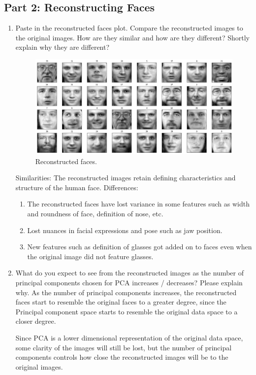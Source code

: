 \subsection{Part 2: Reconstructing Faces}
\begin{enumerate}
    \item Paste in the reconstructed faces plot. Compare the reconstructed images to the original images. How are they similar and how are they different? Shortly explain why they are different?
    \begin{figure}[H]
    	\centering
    	\includegraphics[width=1\textwidth]{templates/reconstructed_faces}
    	\caption{Reconstructed faces.}
    	\label{fig:my_label}
    \end{figure}
Similarities: The reconstructed images retain defining characteristics and structure of the human face.
Differences:
\begin{enumerate}
\item The reconstructed faces have lost variance in some features such as width and roundness of face, definition of nose, etc.
\item Lost nuances in facial expressions and pose such as jaw position.
\item New features such as definition of glasses got added on to faces even when the original image did not feature glasses.
\end{enumerate}
    \item What do you expect to see from the reconstructed images as the number of principal components chosen for PCA increases / decreases? Please explain why.
\newline
\newline
As the number of principal components increases, the reconstructed faces start to resemble the original faces to a greater degree, since the Principal component space starts to resemble the original data space to a closer degree.

Since PCA is a lower dimensional representation of the original data space, some clarity of the images will still be lost, but the number of principal components controls how close the reconstructed images will be to the original images.    
\end{enumerate}
